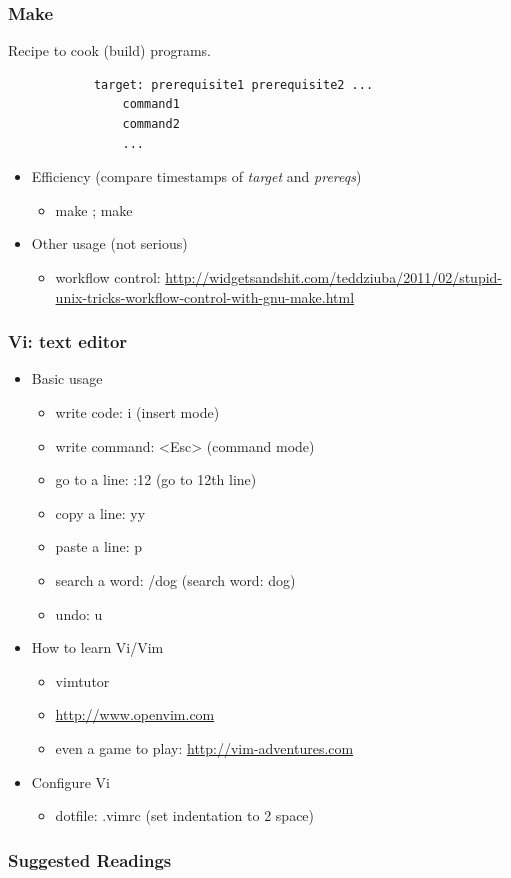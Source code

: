 \documentclass{beamer}
\begin{document}
  \begin{frame}[fragile]
    \frametitle{Make}
    Recipe to cook (build) programs. 
    \begin{verbatim}
			target: prerequisite1 prerequisite2 ...
			    command1
			    command2
			    ...
    \end{verbatim}
		\begin{itemize}
      \item Efficiency (compare timestamps of \textit{target} and \textit{prereqs})
			\begin{itemize}
        \item make ; make
      \end{itemize}
			\item Other usage (not serious)
			\begin{itemize}
        \item workflow control: \textcolor{ExecusharesGrey}{\footnotesize\hspace{1em}\url{http://widgetsandshit.com/teddziuba/2011/02/stupid-unix-tricks-workflow-control-with-gnu-make.html}}
      \end{itemize}						 
    \end{itemize}	
	\end{frame}

	\begin{frame}
		\frametitle{Vi: text editor}
		
		\begin{itemize}
			\item \small Basic usage
			\begin{itemize}
				\item \small write code: i (insert mode)
				\item \small write command: <Esc> (command mode)
				\item \small go to a line: :12 (go to 12th line)
				\item \small copy a line: yy
				\item \small paste a line: p
				\item \small search a word: /dog (search word: dog)
				\item \small undo: u
			\end{itemize} 
      \item \small How to learn Vi/Vim
      \begin{itemize}
        \item \small vimtutor
				\item \small \url{http://www.openvim.com}
				\item \small even a game to play: \url{http://vim-adventures.com}
      \end{itemize}
      \item \small Configure Vi
      \begin{itemize}
				\item \small dotfile: .vimrc (set indentation to 2 space)
			\end{itemize}
    \end{itemize}
  \end{frame}

	\begin{frame}
    \frametitle{Suggested Readings}

	\end{frame}	
\end{document}
